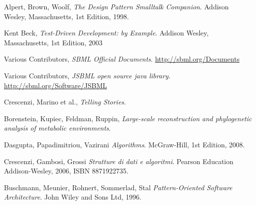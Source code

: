 \begin{thebibliography}{99}

  Alpert, Brown, Woolf,
  \emph{The Design Pattern Smalltalk Companion}.
  Addison Wesley, Massachusetts,
  1st Edition,
  1998.

  Kent Beck,
  \emph{Test-Driven Development: by Example}.
  Addison Wesley, Massachusetts,
  1st Edition,
  2003

  Various Contributors,
  \emph{SBML Official Documents}.
  \url{http://sbml.org/Documents}

 Various Contributors, \emph{JSBML open
    source java library}. \url{http://sbml.org/Software/JSBML}

  Crescenzi, Marino et al.,
  \emph{Telling Stories}.

 Borenstein, Kupiec, Feldman,
  Ruppin, \emph{Large-scale reconstruction and phylogenetic analysis
    of metabolic environments}.

  Dasgupta, Papadimitriou, Vazirani
  \emph{Algorithms}.
  McGraw-Hill,
  1st Edition,
  2008.

  Crescenzi, Gambosi, Grossi
  \emph{Strutture di dati e algoritmi}.
  Pearson Education Addison-Wesley, 2006, ISBN 8871922735.

  Buschmann, Meunier, Rohnert, Sommerlad, Stal
  \emph{Pattern-Oriented Software Architecture}.
  John Wiley and Sons Ltd, 1996.


\end{thebibliography}